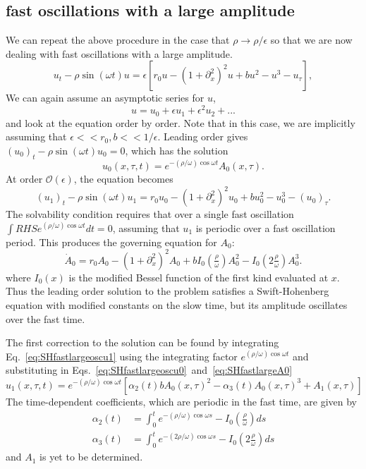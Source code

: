 \documentclass[pre,preprint,superscriptaddress]{revtex4-1}
\begin{document}
\subsection{fast oscillations with a large amplitude}
We can repeat the above procedure in the case that $\rho\rightarrow \rho/\epsilon$ so that we are now dealing with fast oscillations with a large amplitude.
\begin{equation}
u_t-\rho \sin(\omega t) u= \epsilon\left[r_0 u-\left(1+\partial_{x}^2\right)^2u+b u^2-u^3 -u_{\tau}\right]\label{eq:SH},
\end{equation}
 We can again assume an asymptotic series for $u$,
\begin{equation}
u=u_0+\epsilon u_1+ \epsilon^2 u_2+ ...
\end{equation}
and look at the equation order by order.  Note that in this case, we are implicitly assuming that $\epsilon<<r_0,b<<1/\epsilon$.    Leading order gives $(u_0)_t-\rho \sin(\omega t) u_0=0$, which has the solution
\begin{equation}
u_0(x,\tau,t)=e^{-(\rho/\omega) \cos\omega t} A_0(x,\tau).\label{eq:SHfastlargeoscu0}
\end{equation}
At order $\mathcal{O}(\epsilon)$, the equation becomes
\begin{equation}
(u_1)_t-\rho \sin(\omega t) u_1= r_0 u_0-\left(1+\partial_{x}^2\right)^2u_0+ b u_0^2-u_0^3 -(u_0)_{\tau}\label{eq:SHfastlargeoscu1}.
\end{equation}
The solvability condition requires that over a single fast oscillation $\int RHS e^{(\rho/\omega) \cos\omega t}dt=0$, assuming that $u_1$ is periodic over a fast oscillation period. This produces the governing equation for $A_0$:
\begin{equation}
\dot{A}_0= r_0 A_0-\left(1+\partial_{x}^2\right)^2A_0+b I_0(\tfrac{\rho}{\omega}) A_0^2-I_0(2\tfrac{\rho}{\omega})A_0^3\label{eq:SHfastlargeA0}.
\end{equation}
where $I_0(x)$ is the modified Bessel function of the first kind evaluated at $x$. Thus the leading order solution to the problem satisfies a Swift-Hohenberg equation with modified constants on the slow time, but its amplitude oscillates over the fast time. 

The first correction to the solution can be found by integrating Eq.~\ref{eq:SHfastlargeoscu1} using the integrating factor $ e^{(\rho/\omega) \cos\omega t}$ and substituting in Eqs.~\ref{eq:SHfastlargeoscu0}~and~\ref{eq:SHfastlargeA0}  
\begin{equation}
u_1(x,\tau,t)=e^{-(\rho/\omega) \cos\omega t}\left[ \alpha_2(t) b A_0(x,\tau)^2- \alpha_3(t)A_0(x,\tau)^3 + A_1(x,\tau)\right]
\end{equation}
The time-dependent coefficients, which are periodic in the fast time, are  given by
\begin{align}
\alpha_2(t)&=\int_0^t  e^{-(\rho/\omega) \cos\omega s}-I_0(\tfrac{\rho}{\omega})ds \\ 
\alpha_3(t)&=\int_0^t  e^{-(2\rho/\omega) \cos\omega s}-I_0(2\tfrac{\rho}{\omega})ds
\end{align}
and $A_1$ is yet to be determined.
\end{document}
